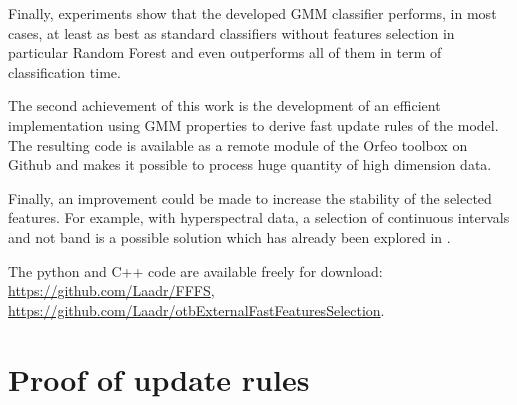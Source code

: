 \documentclass[journal]{IEEEtran}
\begin{document}
Finally, experiments show that the developed GMM classifier performs, in most cases, at least as best as standard classifiers without features selection in particular Random Forest and even outperforms all of them in term of classification time.

The second achievement of this work is the development of an efficient implementation using GMM properties to derive fast update rules of the model. The resulting code is available as a remote module of the Orfeo toolbox on Github and makes it possible to process huge quantity of high dimension data.

Finally, an improvement could be made to increase the stability of the selected features. For example, with hyperspectral data, a selection of continuous intervals and not band is a possible solution which has already been explored in \cite{serpico2007extraction}.

The python and C++ code are available freely for download: \url{https://github.com/Laadr/FFFS}, \url{https://github.com/Laadr/otbExternalFastFeaturesSelection}.

\appendices
\section{Proof of update rules}
\label{app:proof-update}
\end{document}
